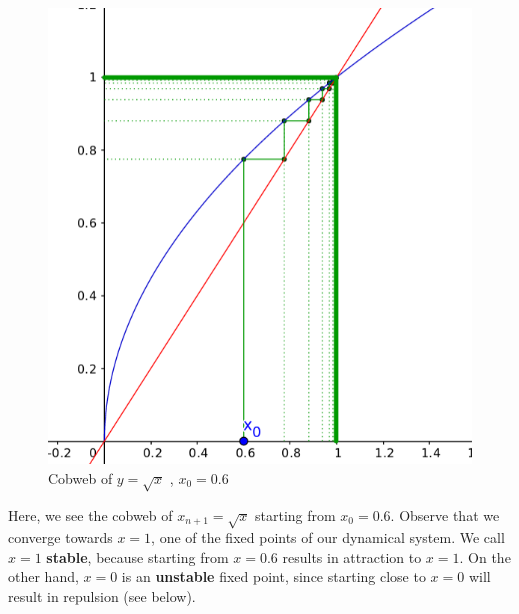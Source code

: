 \documentclass[11pt]{article}
\makeatletter
\def\maxwidth{\ifdim\Gin@nat@width>\linewidth\linewidth
    \else\Gin@nat@width\fi}
\let\Oldincludegraphics\includegraphics
\renewcommand{\includegraphics}[1]{\Oldincludegraphics[width=.8\maxwidth]{#1}}
\makeatother
\begin{document}
\begin{figure}[htbp]
\centering
\includegraphics{cobweb1.png}
\caption{Cobweb of \(y = \sqrt{x}\) , \(x_0 = 0.6\)}
\end{figure}

Here, we see the cobweb of \(x_{n+1} = \sqrt{x}\) starting from
\(x_0 = 0.6\). Observe that we converge towards \(x = 1\), one of the
fixed points of our dynamical system. We call \(x = 1\) \textbf{stable},
because starting from \(x = 0.6\) results in attraction to \(x = 1\). On
the other hand, \(x = 0\) is an \textbf{unstable} fixed point, since
starting close to \(x = 0\) will result in repulsion (see below).
\end{document}
